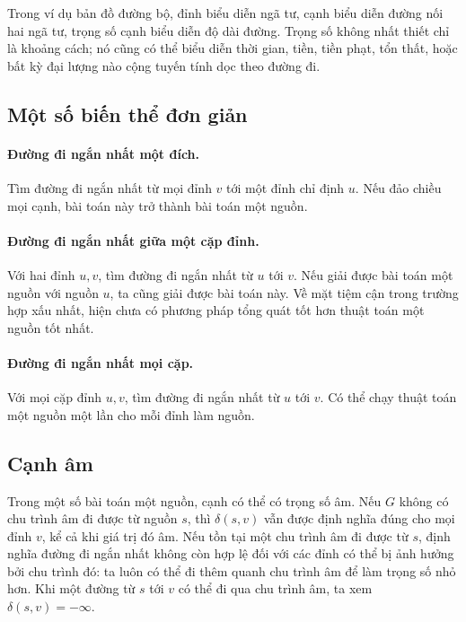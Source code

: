 \documentclass[11pt]{article}
\begin{document}
Trong ví dụ bản đồ đường bộ, đỉnh biểu diễn ngã tư, cạnh biểu diễn đường nối
hai ngã tư, trọng số cạnh biểu diễn độ dài đường. Trọng số không nhất thiết
chỉ là khoảng cách; nó cũng có thể biểu diễn thời gian, tiền, tiền phạt, tổn
thất, hoặc bất kỳ đại lượng nào cộng tuyến tính dọc theo đường đi.

\subsection{Một số biến thể đơn giản}

\paragraph{Đường đi ngắn nhất một đích.}
Tìm đường đi ngắn nhất từ mọi đỉnh \(v\) tới một đỉnh chỉ định \(u\). Nếu đảo
chiều mọi cạnh, bài toán này trở thành bài toán một nguồn.

\paragraph{Đường đi ngắn nhất giữa một cặp đỉnh.}
Với hai đỉnh \(u,v\), tìm đường đi ngắn nhất từ \(u\) tới \(v\). Nếu giải được
bài toán một nguồn với nguồn \(u\), ta cũng giải được bài toán này. Về mặt
tiệm cận trong trường hợp xấu nhất, hiện chưa có phương pháp tổng quát tốt hơn
thuật toán một nguồn tốt nhất.

\paragraph{Đường đi ngắn nhất mọi cặp.}
Với mọi cặp đỉnh \(u,v\), tìm đường đi ngắn nhất từ \(u\) tới \(v\). Có thể
chạy thuật toán một nguồn một lần cho mỗi đỉnh làm nguồn.

\subsection{Cạnh âm}

Trong một số bài toán một nguồn, cạnh có thể có trọng số âm. Nếu \(G\) không
có chu trình âm đi được từ nguồn \(s\), thì \(\delta(s,v)\) vẫn được định
nghĩa đúng cho mọi đỉnh \(v\), kể cả khi giá trị đó âm. Nếu tồn tại một chu
trình âm đi được từ \(s\), định nghĩa đường đi ngắn nhất không còn hợp lệ đối
với các đỉnh có thể bị ảnh hưởng bởi chu trình đó: ta luôn có thể đi thêm
quanh chu trình âm để làm trọng số nhỏ hơn. Khi một đường từ \(s\) tới \(v\)
có thể đi qua chu trình âm, ta xem \(\delta(s,v)=-\infty\).
\end{document}
